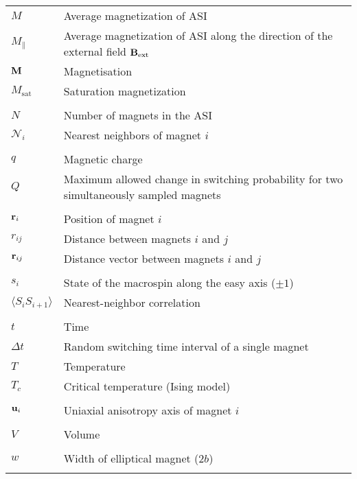 \begin{longtable}[l]{p{60pt} p{350pt}}
	$M$ & Average magnetization of ASI \\
	$M_\parallel$ & Average magnetization of ASI along the direction of the external field $\vb{B}_\mathrm{ext}$ \\
	$\vb{M}$ & Magnetisation \\
	$M_\mathrm{sat}$ & Saturation magnetization \\
	&\\

	$N$ & Number of magnets in the ASI \\ %
	$\mathcal{N}_i$ & Nearest neighbors of magnet $i$ \\
	&\\

	$q$ & Magnetic charge \\
	$Q$ & Maximum allowed change in switching probability for two simultaneously sampled magnets \\
	&\\

	$\vb{r}_i$ & Position of magnet $i$ \\
	$r_{ij}$ & Distance between magnets $i$ and $j$ \\
	$\vb{r}_{ij}$ & Distance vector between magnets $i$ and $j$ \\
	&\\

	$s_i$ & State of the macrospin along the easy axis ($\pm 1$) \\ %
	$\langle S_i S_{i+1} \rangle$ & Nearest-neighbor correlation \\
	&\\

	$t$ & Time \\
	$\Delta t$ & Random switching time interval of a single magnet \\
	$T$ & Temperature \\
	$T_c$ & Critical temperature (Ising model) \\
	&\\

	$\vb{u}_i$ & Uniaxial anisotropy axis of magnet $i$ \\
	&\\

	$V$ & Volume \\
	&\\

	$w$ & Width of elliptical magnet ($2b$) \\
	&\\
\end{longtable}

